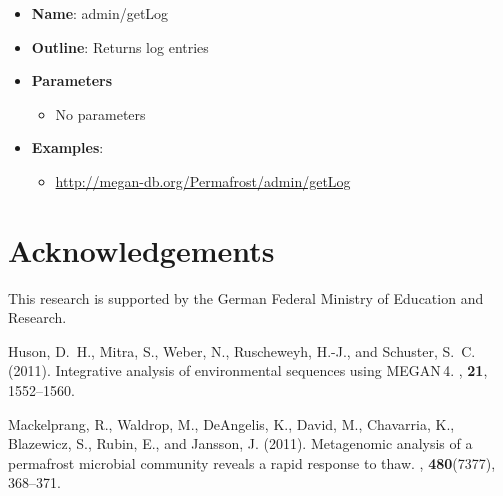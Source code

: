 \documentclass[11pt]{article}
\begin{document}
\begin{itemize}
	\item \textbf{Name}: admin/getLog
	\item \textbf{Outline}: Returns log entries
	\item \textbf{Parameters}
		\begin{itemize}
			\item No parameters
		\end{itemize}
	\item \textbf{Examples}:
		\begin{itemize}		
			\item \url{http://megan-db.org/Permafrost/admin/getLog}
		\end{itemize}
\end{itemize}

\section{Acknowledgements}

This research is supported by the German Federal Ministry of Education and Research.


\begin{thebibliography}{}


Huson, D.~H., Mitra, S., Weber, N., Ruscheweyh, H.-J., and Schuster, S.~C.
  (2011).
\newblock Integrative analysis of environmental sequences using {MEGAN\,4}.
, {\bf 21}, 1552--1560.

Mackelprang, R., Waldrop, M., DeAngelis, K., David, M., Chavarria, K.,
  Blazewicz, S., Rubin, E., and Jansson, J. (2011).
\newblock Metagenomic analysis of a permafrost microbial community reveals a
  rapid response to thaw.
, {\bf 480}(7377), 368--371.

\end{thebibliography}
\end{document}
